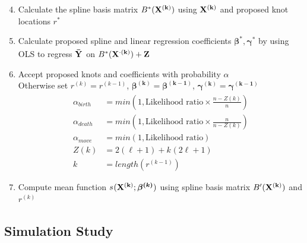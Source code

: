 \documentclass[handout]{beamer}\usepackage[]{graphicx}\usepackage[]{color}
\begin{document}
\begin{frame}

\begin{enumerate}
\setcounter{enumi}{3}
\item
Calculate the spline basis matrix $B^*_{}({\bf X^{(k)}})$ using ${\bf X^{(k)}}$ and proposed knot locations $r_{}^{*}$

\item
Calculate proposed spline and linear regression coefficients $\boldsymbol{\beta^*_{}},\boldsymbol{\gamma^*_{}}$ by using OLS to regress ${\bf \bar{Y}}^{}$ on $B^*_{}({\bf X^{\cdot(k)}}) + {\bf Z}$ \\

\item
Accept proposed knots and coefficients with probability $\alpha_{}$ \\

Otherwise set $r_{}^{(k)}=r_{}^{(k-1)}$, $\boldsymbol{\beta^{(k)}_{}} =\boldsymbol{\beta^{(k-1)}_{}}$, $\boldsymbol{\gamma^{(k)}_{}} =\boldsymbol{\gamma^{(k-1)}_{}}$\\

\begin{align*}
\alpha_{birth} &= min\left(1, \text{Likelihood ratio}\times \frac{n-Z(k)}{n} \right) \\
\alpha_{death} &= min\left(1, \text{Likelihood ratio}\times \frac{n}{n-Z(k)} \right) \\
\alpha_{move} &= min\left(1, \text{Likelihood ratio}\right) \\
Z(k) &= 2(\ell+1) + k_{}(2\ell+1) \\
k_{} &= length(r_{}^{(k-1)}) 
\end{align*}


\item
Compute mean function $s_{}({\bf X^{(k)}};\boldsymbol{\beta^{(k)}_{}})$ using spline basis matrix $B'_{}({\bf X^{(k)}})$ and $r_{}^{(k)}$


\end{enumerate}

\end{frame}

\subsection{Simulation Study}
\end{document}
